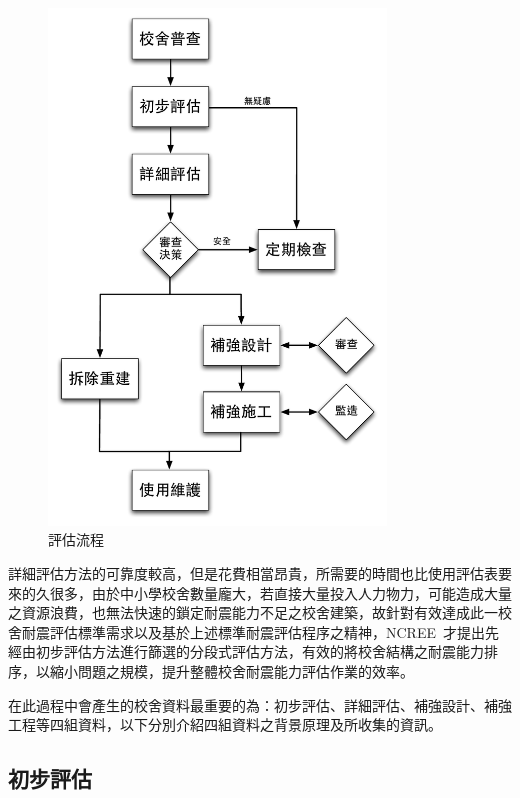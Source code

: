 \begin{figure}[hbtp]
  \begin{center}
    \includegraphics[width=0.8\textwidth]{figures/survey-flow.pdf}
    \caption{評估流程} 
    \label{fig:FLOW}
  \end{center}
\end{figure}

詳細評估方法的可靠度較高，但是花費相當昂貴，所需要的時間也比使用評估表要來的久很多，由於中小學校舍數量龐大，若直接大量投入人力物力，可能造成大量之資源浪費，也無法快速的鎖定耐震能力不足之校舍建築，故針對有效達成此一校舍耐震評估標準需求以及基於上述標準耐震評估程序之精神，NCREE~才提出先經由初步評估方法進行篩選的分段式評估方法，有效的將校舍結構之耐震能力排序，以縮小問題之規模，提升整體校舍耐震能力評估作業的效率。

在此過程中會產生的校舍資料最重要的為：初步評估、詳細評估、補強設計、補強工程等四組資料，以下分別介紹四組資料之背景原理及所收集的資訊。

\subsection{初步評估}

